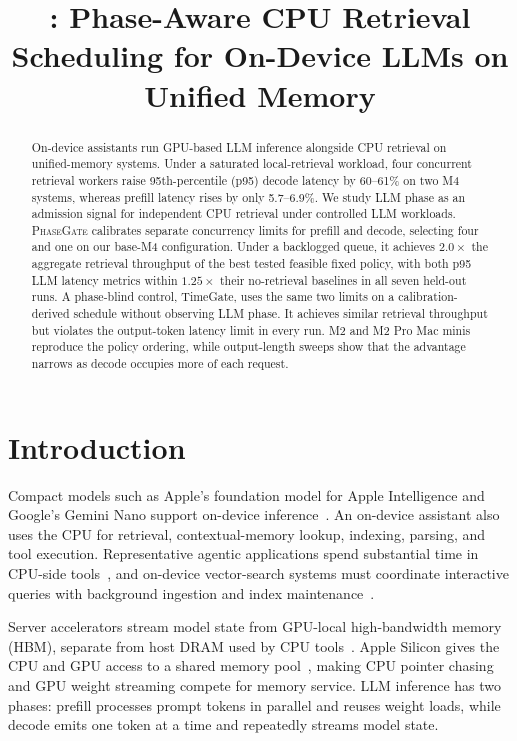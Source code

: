 \documentclass{article}
\title{\texorpdfstring{\system}{PhaseGate}: Phase-Aware CPU Retrieval Scheduling for On-Device LLMs on Unified Memory}
\newcommand{\system}{\textsc{PhaseGate}\xspace}
\begin{document}
\maketitle

\begin{abstract}
On-device assistants run GPU-based LLM inference alongside CPU retrieval on unified-memory systems.
Under a saturated local-retrieval workload, four concurrent retrieval workers raise 95th-percentile (p95) decode latency by 60--61\% on two M4 systems, whereas prefill latency rises by only 5.7--6.9\%.
We study LLM phase as an admission signal for independent CPU retrieval under controlled LLM workloads.
\system calibrates separate concurrency limits for prefill and decode, selecting four and one on our base-M4 configuration.
Under a backlogged queue, it achieves $2.0\times$ the aggregate retrieval throughput of the best tested feasible fixed policy, with both p95 LLM latency metrics within $1.25\times$ their no-retrieval baselines in all seven held-out runs.
A phase-blind control, TimeGate, uses the same two limits on a calibration-derived schedule without observing LLM phase.
It achieves similar retrieval throughput but violates the output-token latency limit in every run.
M2 and M2 Pro Mac minis reproduce the policy ordering, while output-length sweeps show that the advantage narrows as decode occupies more of each request.
\end{abstract}

\section{Introduction}

Compact models such as Apple's foundation model for Apple Intelligence and Google's Gemini Nano support on-device inference~\cite{gunter2024apple,geminiteam2023gemini}.
An on-device assistant also uses the CPU for retrieval, contextual-memory lookup, indexing, parsing, and tool execution.
Representative agentic applications spend substantial time in CPU-side tools~\cite{raj2025cpu}, and on-device vector-search systems must coordinate interactive queries with background ingestion and index maintenance~\cite{zhao2026muse}.

Server accelerators stream model state from GPU-local high-bandwidth memory (HBM), separate from host DRAM used by CPU tools~\cite{nvidia2022h100,zhong2024distserve}.
Apple Silicon gives the CPU and GPU access to a shared memory pool~\cite{apple2020m1}, making CPU pointer chasing and GPU weight streaming compete for memory service.
LLM inference has two phases: prefill processes prompt tokens in parallel and reuses weight loads, while decode emits one token at a time and repeatedly streams model state.
\end{document}
